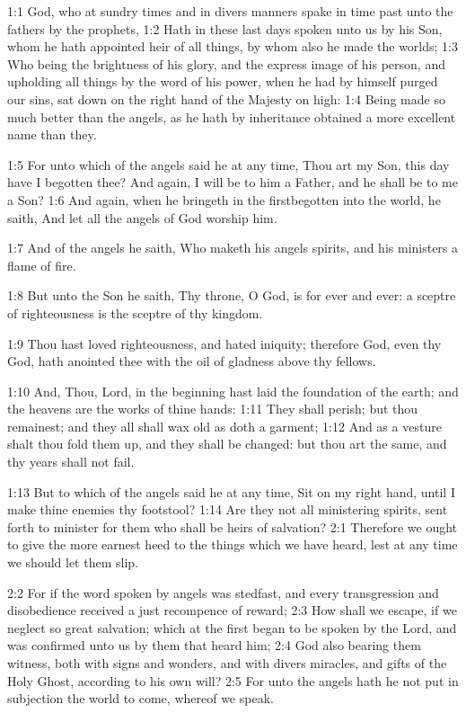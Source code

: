 

1:1 God, who at sundry times and in divers manners spake in time past unto the fathers by the prophets, 1:2 Hath in these last days spoken unto us by his Son, whom he hath appointed heir of all things, by whom also he made the worlds; 1:3 Who being the brightness of his glory, and the express image of his person, and upholding all things by the word of his power, when he had by himself purged our sins, sat down on the right hand of the Majesty on high: 1:4 Being made so much better than the angels, as he hath by inheritance obtained a more excellent name than they.

1:5 For unto which of the angels said he at any time, Thou art my Son, this day have I begotten thee? And again, I will be to him a Father, and he shall be to me a Son?  1:6 And again, when he bringeth in the firstbegotten into the world, he saith, And let all the angels of God worship him.

1:7 And of the angels he saith, Who maketh his angels spirits, and his ministers a flame of fire.

1:8 But unto the Son he saith, Thy throne, O God, is for ever and ever: a sceptre of righteousness is the sceptre of thy kingdom.

1:9 Thou hast loved righteousness, and hated iniquity; therefore God, even thy God, hath anointed thee with the oil of gladness above thy fellows.

1:10 And, Thou, Lord, in the beginning hast laid the foundation of the earth; and the heavens are the works of thine hands: 1:11 They shall perish; but thou remainest; and they all shall wax old as doth a garment; 1:12 And as a vesture shalt thou fold them up, and they shall be changed: but thou art the same, and thy years shall not fail.

1:13 But to which of the angels said he at any time, Sit on my right hand, until I make thine enemies thy footstool?  1:14 Are they not all ministering spirits, sent forth to minister for them who shall be heirs of salvation?  2:1 Therefore we ought to give the more earnest heed to the things which we have heard, lest at any time we should let them slip.

2:2 For if the word spoken by angels was stedfast, and every transgression and disobedience received a just recompence of reward; 2:3 How shall we escape, if we neglect so great salvation; which at the first began to be spoken by the Lord, and was confirmed unto us by them that heard him; 2:4 God also bearing them witness, both with signs and wonders, and with divers miracles, and gifts of the Holy Ghost, according to his own will?  2:5 For unto the angels hath he not put in subjection the world to come, whereof we speak.

